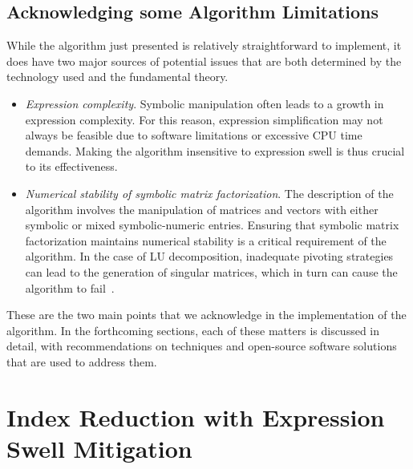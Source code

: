 \subsection{Acknowledging some Algorithm Limitations}

While the algorithm just presented is relatively straightforward to implement, it does have two major sources of potential issues that are both determined by the technology used and the fundamental theory.
%
\begin{itemize}
  \setlength{\itemsep}{0.0em}
  \item \emph{Expression complexity}. Symbolic manipulation often leads to a growth in expression complexity. For this reason, expression simplification may not always be feasible due to software limitations or excessive \ac{CPU} time demands. Making the algorithm insensitive to expression swell is thus crucial to its effectiveness.
  \item \emph{Numerical stability of symbolic matrix factorization}. The description of the algorithm involves the manipulation of matrices and vectors with either symbolic or mixed symbolic-numeric entries. Ensuring that symbolic matrix factorization maintains numerical stability is a critical requirement of the algorithm. In the case of \ac{LU} decomposition, inadequate pivoting strategies can lead to the generation of singular matrices, which in turn can cause the algorithm to fail~\cite{zhou2005implicit, zhou2007symbolic, giesbrecht2014symbolic}.
\end{itemize}
%
These are the two main points that we acknowledge in the implementation of the algorithm. In the forthcoming sections, each of these matters is discussed in detail, with recommendations on techniques and open-source software solutions that are used to address them.


\section{Index Reduction with Expression Swell Mitigation}

